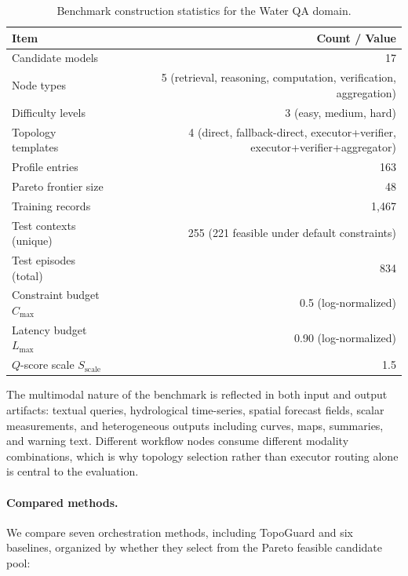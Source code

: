 \documentclass[acmsmall,review,anonymous]{acmart}
\begin{document}
\begin{table}[t]
\centering
\caption{Benchmark construction statistics for the Water QA domain.}
\label{tab:benchmark_stats}
\small
\begin{tabular}{lr}
\toprule
\textbf{Item} & \textbf{Count / Value} \\
\midrule
Candidate models & 17 \\
Node types & 5 (retrieval, reasoning, computation, verification, aggregation) \\
Difficulty levels & 3 (easy, medium, hard) \\
Topology templates & 4 (direct, fallback-direct, executor+verifier, executor+verifier+aggregator) \\
Profile entries & 163 \\
Pareto frontier size & 48 \\
Training records & 1,467 \\
Test contexts (unique) & 255 (221 feasible under default constraints) \\
Test episodes (total) & 834 \\
Constraint budget $C_{\max}$ & 0.5 (log-normalized) \\
Latency budget $L_{\max}$ & 0.90 (log-normalized) \\
$Q$-score scale $S_{\text{scale}}$ & 1.5 \\
\bottomrule
\end{tabular}
\end{table}

The multimodal nature of the benchmark is reflected in both input and output artifacts: textual queries, hydrological time-series, spatial forecast fields, scalar measurements, and heterogeneous outputs including curves, maps, summaries, and warning text. Different workflow nodes consume different modality combinations, which is why topology selection rather than executor routing alone is central to the evaluation.

\paragraph{Compared methods.}
We compare seven orchestration methods, including TopoGuard and six baselines, organized by whether they select from the Pareto feasible candidate pool:
\end{document}
